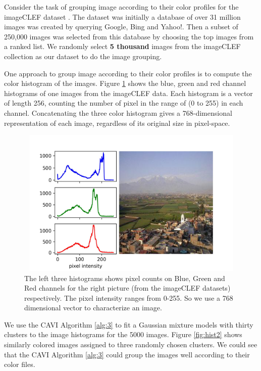 \documentclass[letterpaper]{article}
\begin{document}
Consider the task of grouping image according to their color profiles for the imageCLEF dataset \citep{villegas2014overview}. The dataset was initially a database of over 31 million images was created by querying Google, Bing and Yahoo!. Then a subset of 250,000 images was selected from this database by choosing the top images from a ranked list. We randomly select \textbf{5 thousand} images from the imageCLEF collection as our dataset to do the image grouping.

One approach to group image according to their color profiles is to compute the color histogram of the images. Figure \ref{fig:hist1} shows the blue, green and red channel histograms of one images from the imageCLEF data. Each histogram is a vector of length 256, counting the number of pixel in the range of (0 to 255) in each channel. Concatenating the three color histogram gives a 768-dimensional representation of each image, regardless of its original size in pixel-space.

\begin{figure}[H]
  \centering
    \includegraphics[width=5in, height=2.8in]{outputs/report_figs/hist_demo.jpeg}
  \caption{The left three histograms shows pixel counts on Blue, Green and Red channels for the right picture (from the imageCLEF datasets) respectively. The pixel intensity ranges from 0-255. So we use a 768 dimensional vector to characterize an image.}
\label{fig:hist1}
\end{figure}

We use the CAVI Algorithm \ref{alg:3} to fit a Gaussian mixture models with thirty clusters to the image histograms for the 5000 images. Figure \ref{fig:hist2} shows similarly colored images assigned to three randomly chosen clusters. We could see that the CAVI Algorithm \ref{alg:3} could group the images well according to their color files.
\end{document}
